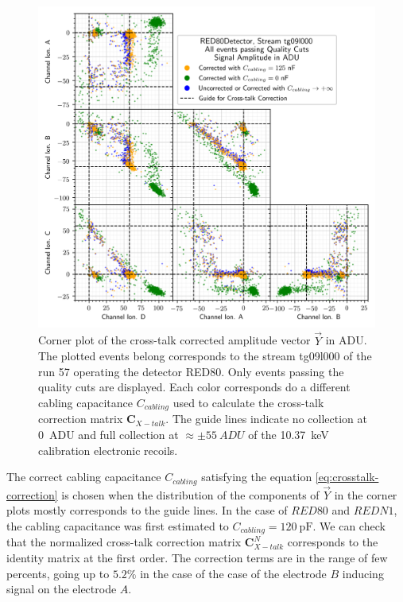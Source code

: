 \begin{figure}
\centering
\includegraphics[scale=1]{Figures/ElectrodesExperimental/red80_crosstalk_correction.png}
\caption{Corner plot of the cross-talk corrected amplitude vector $\vec{Y}$ in ADU. The plotted events belong corresponds to the stream tg09l000 of the run 57 operating the detector RED80. Only events passing the quality cuts are displayed. Each color corresponds do a different cabling capacitance $C_{cabling}$ used to calculate the cross-talk correction matrix $\bm{C}_{X-talk}$. The guide lines indicate no collection at \SI{0}{ADU} and full collection at $\approx \pm \SI{55}{ADU}$ of the \SI{10.37}{\kilo\eV} calibration electronic recoils.}
\label{fig:red80-crosstalk-correction}
\end{figure}

The correct cabling capacitance $C_{cabling}$ satisfying the equation \ref{eq:crosstalk-correction} is chosen when the distribution of the components of $\vec{Y}$ in the corner plots mostly corresponds to the guide lines.
In the case of $RED80$ and $REDN1$, the cabling capacitance was first estimated to $C_{cabling} = \SI{120}{\pico\farad}$. 
We  can check that the normalized cross-talk correction matrix $\bm{C}_{X-talk}^N$ corresponds to the identity matrix at the first order. The correction terms are in the range of few percents, going up to $5.2\%$ in the case of the case of the electrode $B$ inducing signal on the electrode $A$.

